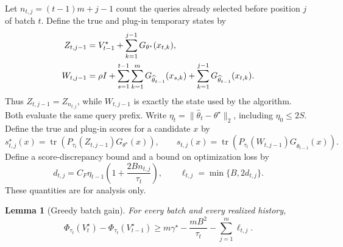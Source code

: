 \documentclass[10pt,twoside,letterpaper]{article}
\newtheorem{lemma}{Lemma}[section]
\newcommand{\tr}{\operatorname{tr}}
\newcommand{\norm}[1]{\lVert #1\rVert}
\begin{document}
Let $n_{t,j}=(t-1)m+j-1$ count the queries already selected before
position $j$ of batch $t$. Define the true and plug-in temporary states by
\begin{align}
Z_{t,j-1}
&=V_{t-1}^\star+\sum_{k=1}^{j-1}G_{\theta^\star}(x_{t,k}),\notag\\
W_{t,j-1}
&=\rho I+\sum_{s=1}^{t-1}\sum_{k=1}^m
 G_{\widehat\theta_{t-1}}(x_{s,k})
 +\sum_{k=1}^{j-1}G_{\widehat\theta_{t-1}}(x_{t,k}).
\label{eq:app-true-temporary}
\end{align}
Thus $Z_{t,j-1}=Z_{n_{t,j}}$, while $W_{t,j-1}$ is exactly the
state used by the algorithm. Both evaluate the same query prefix.
Write $\eta_t=\norm{\widehat\theta_t-\theta^\star}_2$, including
$\eta_0\le2S$. Define the true and plug-in scores for a candidate $x$ by
\begin{equation}
s_{t,j}^\star(x)=\tr(P_{\tau_t}(Z_{t,j-1})G_{\theta^\star}(x)),
\qquad
\widehat s_{t,j}(x)=\tr(P_{\tau_t}(W_{t,j-1})
 G_{\widehat\theta_{t-1}}(x)).
\label{eq:app-two-scores}
\end{equation}
Define a score-discrepancy bound and a bound on optimization loss by
\begin{equation}
d_{t,j}=C_F\eta_{t-1}\left(1+\frac{2Bn_{t,j}}{\tau_t}\right),
\qquad \ell_{t,j}=\min\{B,2d_{t,j}\}.
\label{eq:app-score-loss}
\end{equation}
These quantities are for analysis only.

\begin{lemma}[Greedy batch gain]
\label{lem:batch}
For every batch and every realized history,
\begin{equation}
\Phi_{\tau_t}(V_t^\star)-\Phi_{\tau_t}(V_{t-1}^\star)
\ge m\gamma^\star-\frac{mB^2}{\tau_t}
-\sum_{j=1}^m\ell_{t,j}.
\label{eq:app-batch-gain}
\end{equation}
\end{lemma}
\end{document}
